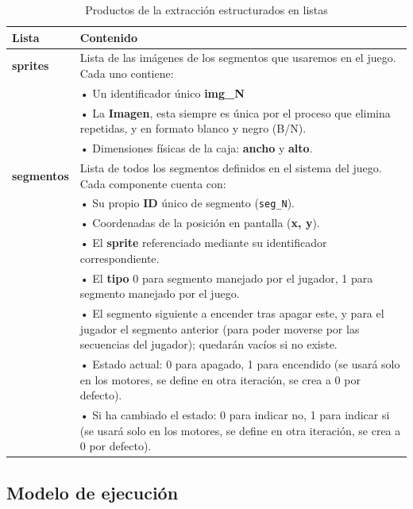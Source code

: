 \begin{table}[htbp]
	\centering
	\begin{tabular}{lp{10cm}}
		\toprule
		\textbf{Lista} & \textbf{Contenido} \\ 
		\midrule
		\textbf{sprites} & Lista de las imágenes de los segmentos que usaremos en el juego. Cada uno contiene: \\
		& • Un identificador único \textbf{img\_N} \\
		& • La \textbf{Imagen}, esta siempre es única por el proceso que elimina repetidas, y en formato blanco y negro (B/N). \\
		& • Dimensiones físicas de la caja: \textbf{ancho} y \textbf{alto}. \\ \addlinespace
		
		\textbf{segmentos} & Lista de todos los segmentos definidos en el sistema del juego. Cada componente cuenta con: \\
		& • Su propio \textbf{ID} único de segmento (\texttt{seg\_N}). \\
		& • Coordenadas de la posición en pantalla (\textbf{x, y}). \\
		& • El \textbf{sprite} referenciado mediante su identificador correspondiente. \\
		& • El \textbf{tipo} 0 para segmento manejado por el jugador, 1 para segmento manejado por el juego. \\
		& • El segmento siguiente a encender tras apagar este, y para el jugador el segmento anterior (para poder moverse por las secuencias del jugador); quedarán vacíos si no existe. \\ 
		& • Estado actual: 0 para apagado, 1 para encendido (se usará solo en los motores, se define en otra iteración, se crea a 0 por defecto). \\
		& • Si ha cambiado el estado: 0 para indicar no, 1 para indicar si (se usará solo en los motores, se define en otra iteración, se crea a 0 por defecto). \\ 
		\bottomrule
	\end{tabular}
	\caption{Productos de la extracción estructurados en listas}
	\label{tab:productosExtraccionListas}
\end{table}


\subsection{Modelo de ejecución}

